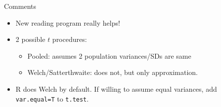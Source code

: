 \begin{frame}{Comments}

  \begin{itemize}
  \item New reading program really helps!
  \item 2 possible $t$ procedures:
    \begin{itemize}
    \item Pooled: assumes 2 population variances/SDs are same
    \item Welch/Satterthwaite: does not, but only approximation.
    \end{itemize}
  \item R does Welch by default. If willing to assume equal variances,
    add \texttt{var.equal=T} to \texttt{t.test}.
  \end{itemize}
  
\end{frame}
